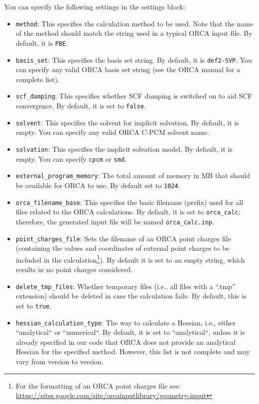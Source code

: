 \documentclass[]{tufte-book}
\begin{document}
You can specify the following settings in the settings block:
\begin{itemize}
\item \texttt{method}: This specifies the calculation method to be used.
Note that the name of the method should match the string used in a typical \textsc{ORCA} input file.
By default, it is \texttt{PBE}.
\item \texttt{basis\_set}: This specifies the basis set string. By default, it is \texttt{def2-SVP}. You can specify
any valid ORCA basis set string (see the \textsc{ORCA} manual for a complete list).
\item \texttt{scf\_damping}: This specifies whether SCF damping is switched on to aid SCF convergence. By default, it is set to \texttt{false}.
\item \texttt{solvent}: This specifies the solvent for implicit solvation. By default, it is empty. You can specify any valid \textsc{ORCA} C-PCM solvent name.
\item \texttt{solvation}: This specifies the implicit solvation model. By default, it is empty. You can specify \texttt{cpcm} or \texttt{smd}.
\item \texttt{external\_program\_memory}: The total amount of memory in MB that should be available for \textsc{ORCA} to use.
By default set to \texttt{1024}.
\item \texttt{orca\_filename\_base}: This specifies the basic filename (prefix) used for all files related to the \textsc{ORCA} calculations.
By default, it is set to \texttt{orca\_calc}; therefore, the generated input file will be named \texttt{orca\_calc.inp}.
\item \texttt{point\_charges\_file}: Sets the filename of an \textsc{ORCA} point charges file (containing the values and coordinates of
external point charges to be included in the calculation\footnote{For the formatting of an \textsc{ORCA} point charges file see: \url{https://sites.google.com/site/orcainputlibrary/geometry-input}}).
By default it is set to an empty string, which results
in no point charges considered.
\item \texttt{delete\_tmp\_files}: Whether temporary files (i.e., all files with a ``.tmp'' extension) should be deleted in case
the calculation fails. By default, this is set to \texttt{true}.
\item \texttt{hessian\_calculation\_type}: The way to calculate a Hessian, i.e., either ``analytical`` or ``numerical``. By default, it is set to ``analytical``, unless it is already specified in our code that \textsc{ORCA} does not provide an analytical Hessian for the specified method. However, this list is not complete and may vary from version to version.

\end{itemize}
\end{document}
